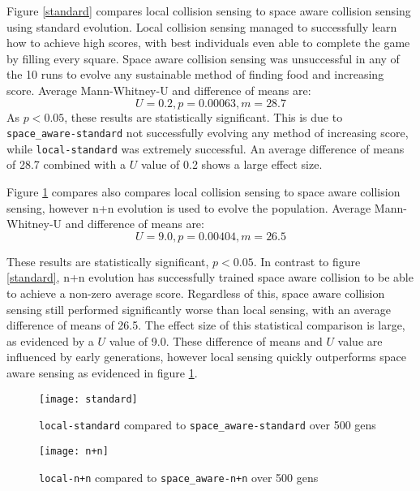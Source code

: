 Figure \ref{standard} compares local collision sensing to space aware collision sensing using standard evolution. Local collision sensing managed to successfully learn how to achieve high scores, with best individuals even able to complete the game by filling every square. Space aware collision sensing was unsuccessful in any of the 10 runs to evolve any sustainable method of finding food and increasing score. Average Mann-Whitney-U and difference of means are:
$$
U = 0.2, p = 0.00063, m = 28.7
$$
As $p < 0.05$, these results are statistically significant. This is due to \verb|space_aware-standard| not successfully evolving any method of increasing score, while \verb|local-standard| was extremely successful. An average difference of means of 28.7 combined with a $U$ value of 0.2 shows a large effect size.
\bigskip

Figure \ref{n+n} compares also compares local collision sensing to space aware collision sensing, however n+n evolution is used to evolve the population.  Average Mann-Whitney-U and difference of means are:
$$
U = 9.0, p = 0.00404, m = 26.5
$$

These results are statistically significant, $p < 0.05$. In contrast to figure \ref{standard}, n+n evolution has successfully trained space aware collision to be able to achieve a non-zero average score. Regardless of this, space aware collision sensing still performed significantly worse than local sensing, with an average difference of means of 26.5. The effect size of this statistical comparison is large, as evidenced by a $U$ value of 9.0. These difference of means and $U$ value are influenced by early generations, however local sensing quickly outperforms space aware sensing as evidenced in figure \ref{n+n}.

\begin{figure}[h]
  \centering
  \begin{minipage}{.5\textwidth}
    \centering
    \captionsetup{width=.8\linewidth}
    \texttt{[image: standard]}
    \caption{\texttt{local-standard} compared to \texttt{space\_aware-standard} over 500 gens}
    \label{standard}
  \end{minipage}%
  \begin{minipage}{.5\textwidth}
    \centering
    \captionsetup{width=.8\linewidth}
    \texttt{[image: n+n]}
    \caption{\texttt{local-n+n} compared to \texttt{space\_aware-n+n} over 500 gens}
    \label{n+n}
  \end{minipage}
\end{figure}





